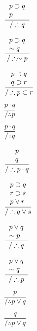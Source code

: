 \documentclass[12pt]{article}
\begin{document}
$\dfrac{\begin{tabular}{l}$p\supset q$ \\ $p$ \end{tabular}}{/\therefore q}$


$\dfrac{\begin{tabular}{l}$p\supset q$ \\ $\sim q$ \end{tabular}}{/\therefore \sim p}$

$\dfrac{\begin{tabular}{l}$p\supset q$ \\ $q\supset r$ \end{tabular}}{/\therefore p \subset r}$

$\dfrac{p\cdot q}{/\therefore p}$

$\dfrac{p\cdot q}{/\therefore q}$

$\dfrac{\begin{tabular}{l}$p$ \\ $q$ \end{tabular}}{/\therefore p\cdot q}$

$\dfrac{\begin{tabular}{l}$p\supset q$ \\ $r\supset s$ \\ $p\lor r$ \end{tabular}}{/\therefore q \lor s}$

$\dfrac{\begin{tabular}{l}$p\lor q$ \\ $\sim p$ \end{tabular}}{/\therefore q}$

$\dfrac{\begin{tabular}{l}$p\lor q$ \\ $\sim q$ \end{tabular}}{/\therefore p}$

$\dfrac{p}{/\therefore p\lor q}$

$\dfrac{q}{/\therefore p \lor q}$\\
 \\
\end{document}
